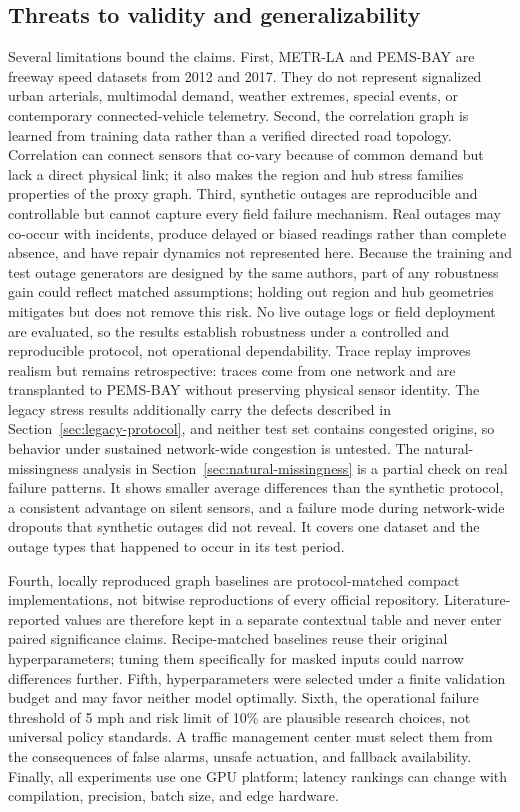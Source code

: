 \documentclass[preprint,12pt]{elsarticle}
\begin{document}
\subsection{Threats to validity and generalizability}
Several limitations bound the claims. First, METR-LA and PEMS-BAY are freeway
speed datasets from 2012 and 2017. They do not represent signalized urban
arterials, multimodal demand, weather extremes, special events, or contemporary
connected-vehicle telemetry. Second, the correlation graph is learned from
training data rather than a verified directed road topology. Correlation can
connect sensors that co-vary because of common demand but lack a direct physical
link; it also makes the region and hub stress families properties of the proxy
graph. Third, synthetic outages are reproducible and controllable but cannot
capture every field failure mechanism. Real outages may co-occur with incidents,
produce delayed or biased readings rather than complete absence, and have
repair dynamics not represented here. Because the training and test outage
generators are designed by the same authors, part of any robustness gain could
reflect matched assumptions; holding out region and hub geometries mitigates
but does not remove this risk. No live outage logs or field deployment are
evaluated, so the results establish robustness under a controlled and
reproducible protocol, not operational dependability. Trace replay improves
realism but remains retrospective: traces come from one network and are
transplanted to PEMS-BAY without preserving physical sensor identity. The
legacy stress results additionally carry the defects described in
Section~\ref{sec:legacy-protocol}, and neither test set contains congested
origins, so behavior under sustained network-wide congestion is untested.
The natural-missingness analysis in Section~\ref{sec:natural-missingness}
is a partial check on real failure patterns. It shows smaller average
differences than the synthetic protocol, a consistent advantage on silent
sensors, and a failure mode during network-wide dropouts that synthetic
outages did not reveal. It covers one dataset and the outage types that
happened to occur in its test period.

Fourth, locally reproduced graph baselines are protocol-matched compact
implementations, not bitwise reproductions of every official repository.
Literature-reported values are therefore kept in a separate contextual table
and never enter paired significance claims. Recipe-matched baselines reuse
their original hyperparameters; tuning them specifically for masked inputs
could narrow differences further. Fifth, hyperparameters were selected
under a finite validation budget and may favor neither model optimally. Sixth,
the operational failure threshold of 5 mph and risk limit of 10\% are plausible
research choices, not universal policy standards. A traffic management center
must select them from the consequences of false alarms, unsafe actuation, and
fallback availability. Finally, all experiments use one GPU platform; latency
rankings can change with compilation, precision, batch size, and edge hardware.
\end{document}
